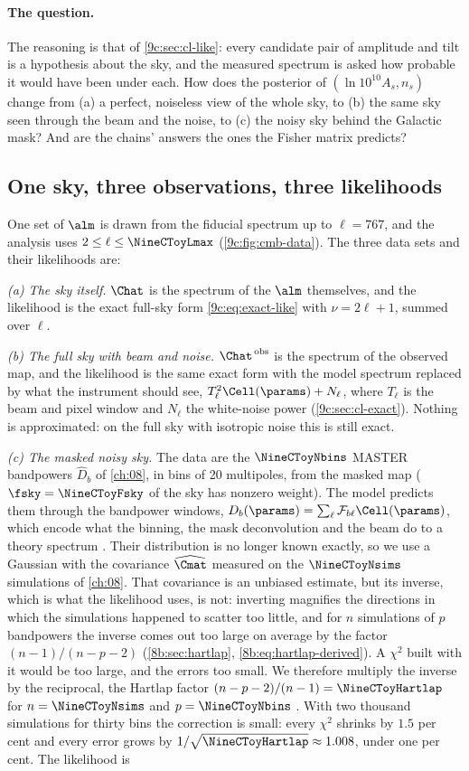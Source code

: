\paragraph{The question.} The reasoning is that of \cref{9c:sec:cl-like}: every candidate pair of amplitude and
tilt is a hypothesis about the sky, and the measured spectrum is asked how probable it would have been under
each. How does the posterior of $(\ln10^{10}A_s,n_s)$ change from (a) a perfect,
noiseless view of the whole sky, to (b) the same sky seen through the beam and the noise, to (c) the noisy
sky behind the Galactic mask? And are the chains' answers the ones the Fisher matrix predicts?

\subsection{One sky, three observations, three likelihoods}
\label{9c:sec:toy-data}

One set of $\alm$ is drawn from the fiducial spectrum up to $\ell=767$, and the analysis uses
$2\le\ell\le\NineCToyLmax$ (\cref{9c:fig:cmb-data}). The three data sets and their likelihoods are:

\emph{(a) The sky itself.} $\Chat$ is the spectrum of the $\alm$ themselves, and the likelihood is the exact
full-sky form \eqref{9c:eq:exact-like} with $\nu=2\ell+1$, summed over $\ell$.

\emph{(b) The full sky with beam and noise.} $\Chat^{\,\rm obs}$ is the spectrum of the observed map, and the
likelihood is the same exact form with the model spectrum replaced by what the instrument should see,
$T_\ell^2\Cell(\params)+N_\ell$, where $T_\ell$ is the beam and pixel window and $N_\ell$ the white-noise power
(\cref{9c:sec:cl-exact}). Nothing is approximated: on the full sky with isotropic noise this is still exact.

\emph{(c) The masked noisy sky.} The data are the $\NineCToyNbins$ MASTER bandpowers $\widehat D_b$ of
\cref{ch:08}, in bins of 20 multipoles, from the masked map ($\fsky=\NineCToyFsky$ of the sky has nonzero
weight). The model predicts them through the bandpower windows, $D_b(\params)=\sum_\ell\mathcal F_{b\ell}\Cell(\params)$,
which encode what the binning, the mask deconvolution and the beam do to a theory spectrum
\cite{Hivon2002}. Their distribution is no longer known exactly, so we use a Gaussian with the covariance
$\widehat{\Cmat}$ measured on the $\NineCToyNsims$ simulations of \cref{ch:08}. That covariance is an unbiased
estimate, but its inverse, which is what the likelihood uses, is not: inverting magnifies the directions in which
the simulations happened to scatter too little, and for $n$ simulations of $p$ bandpowers the inverse comes out
too large on average by the factor $(n-1)/(n-p-2)$ (\cref{8b:sec:hartlap}, \eqref{8b:eq:hartlap-derived}). A
$\chi^2$ built with it would be too large, and the errors too small. We therefore multiply the inverse by the
reciprocal, the Hartlap factor $(n-p-2)/(n-1)=\NineCToyHartlap$ for $n=\NineCToyNsims$ and $p=\NineCToyNbins$
\cite{Hartlap2007}. With two thousand simulations for thirty bins the correction is small: every $\chi^2$ shrinks by
$1.5$ per cent and every error grows by $1/\sqrt{\NineCToyHartlap}\approx1.008$, under one per cent.
The likelihood is

